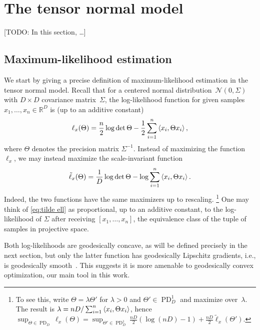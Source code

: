 \documentclass{article}
\newcommand{\R}{{\mathbb{R}}}
\newcommand\cN{\mathcal{N}}
\newcommand\PD{\operatorname{PD}}
\newcommand\samp{x}
\newcommand{\TODO}[1]{{\color{blue}[TODO: #1]}}
\begin{document}
\section{The tensor normal model}
\TODO{In this section, \dots}

\subsection{Maximum-likelihood estimation}
We start by giving a precise definition of maximum-likelihood estimation in the tensor normal model.
Recall that for a centered normal distribution~$\cN(0,\Sigma)$ with $D\times D$ covariance matrix~$\Sigma$, the log-likelihood function for given samples $\samp_1,\dots,\samp_n\in\R^D$ is (up to an additive constant)
\begin{align*}
  \ell_{\samp}(\Theta)
  = \frac n2 \log \det \Theta - \frac12 \sum_{i=1}^n \braket{\samp_i, \Theta \samp_i},
\end{align*}
where $\Theta$ denotes the precision matrix $\Sigma^{-1}$.
Instead of maximizing the function~$\ell_{\samp}$, we may instead maximize the scale-invariant function
\begin{align}\label{eq:tilde ell}
  \tilde\ell_{\samp}(\Theta) = \frac1D\log\det \Theta - \log \sum_{i=1}^n \braket{\samp_i, \Theta \samp_i}.
\end{align}
Indeed, the two functions have the same maximizers up to rescaling.%
\footnote{To see this, write $\Theta = \lambda \Theta'$ for $\lambda>0$ and $\Theta'\in\PD_D^1$ and maximize over~$\lambda$.
The result is $\lambda = n D / \sum_{i=1}^n \braket{\samp_i, \Theta \samp_i}$, hence $\sup_{\Theta\in\PD_D} \ell_{\samp}(\Theta) = \sup_{\Theta'\in\PD_D^1} \frac {nD}2 \left( \log(nD) - 1 \right) + \frac{nD}2 \tilde\ell_{\samp}(\Theta')$.}
One may think of \cref{eq:tilde ell} as proportional, up to an additive constant, to the log-likelihood of $\Sigma$ after receiving $[\samp_1, \dots, \samp_n]$, the equivalence class of the tuple of samples in projective space.

Both log-likelihoods are geodesically concave, as will be defined precisely in the next section, but only the latter function has geodesically Lipschitz gradients, i.e., is geodesically smooth~\cite{burgisser2019towards}.
This suggests it is more amenable to geodesically convex optimization, our main tool in this work.
\end{document}
